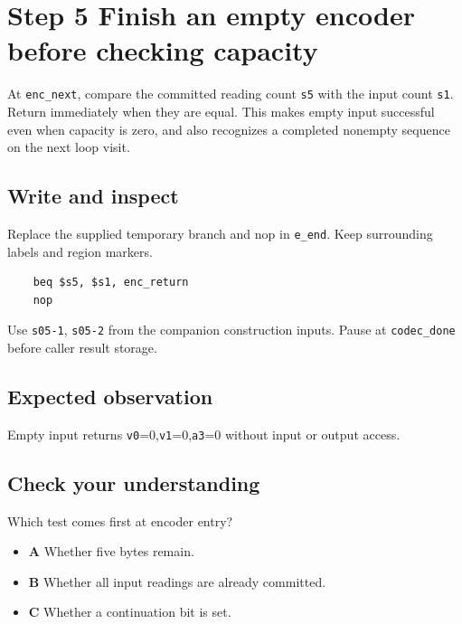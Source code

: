 \section{Step 5 Finish an empty encoder before checking capacity}\label{delta-s05}

At \texttt{enc\_next}, compare the committed reading count \texttt{s5} with the input count \texttt{s1}. Return immediately when they are equal. This makes empty input successful even when capacity is zero, and also recognizes a completed nonempty sequence on the next loop visit.

\subsection{Write and inspect}
Replace the supplied temporary branch and nop in \texttt{e\_end}. Keep surrounding labels and region markers.

\begin{verbatim}
    beq $s5, $s1, enc_return
    nop
\end{verbatim}
Use \texttt{s05-1}, \texttt{s05-2} from the companion construction inputs. Pause at \texttt{codec\_done} before caller result storage.

\subsection{Expected observation}
Empty input returns \texttt{v0}=0,\texttt{v1}=0,\texttt{a3}=0 without input or output access.

\subsection{Check your understanding}
Which test comes first at encoder entry?

\begin{itemize}
\item \textbf{A} Whether five bytes remain.
\item \textbf{B} Whether all input readings are already committed.
\item \textbf{C} Whether a continuation bit is set.
\end{itemize}
